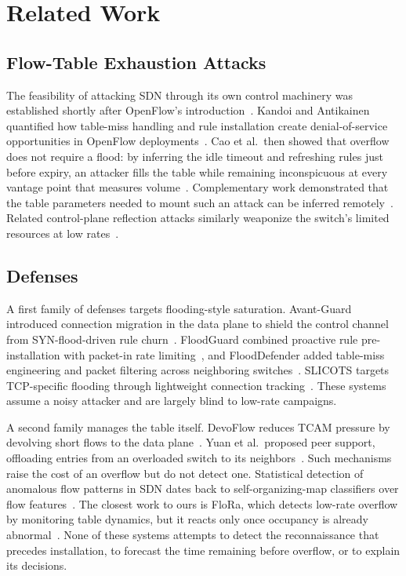 \documentclass[conference]{IEEEtran}
\begin{document}
\section{Related Work}\label{sec:related}
\subsection{Flow-Table Exhaustion Attacks}
The feasibility of attacking SDN through its own control machinery was
established shortly after OpenFlow's introduction~\cite{shin2013attacking}.
Kandoi and Antikainen quantified how table-miss handling and rule installation
create denial-of-service opportunities in OpenFlow
deployments~\cite{kandoi2015dos}. Cao et al.\ then showed that overflow does not
require a flood: by inferring the idle timeout and refreshing rules just before
expiry, an attacker fills the table while remaining inconspicuous at every
vantage point that measures volume~\cite{cao2017loft}. Complementary work
demonstrated that the table parameters needed to mount such an attack can be
inferred remotely~\cite{leng2015inference}. Related control-plane reflection
attacks similarly weaponize the switch's limited resources at low
rates~\cite{zhang2018reflection}.

\subsection{Defenses}
A first family of defenses targets flooding-style saturation.
Avant-Guard introduced connection migration in the data plane to shield the
control channel from SYN-flood-driven rule churn~\cite{shin2013avantguard}.
FloodGuard combined proactive rule pre-installation with packet-in rate
limiting~\cite{wang2015floodguard}, and FloodDefender added table-miss
engineering and packet filtering across neighboring
switches~\cite{shang2017flooddefender}. SLICOTS targets TCP-specific flooding
through lightweight connection tracking~\cite{mohammadi2017slicots}. These
systems assume a noisy attacker and are largely blind to low-rate campaigns.

A second family manages the table itself. DevoFlow reduces TCAM pressure by
devolving short flows to the data plane~\cite{curtis2011devoflow}. Yuan et al.\
proposed peer support, offloading entries from an overloaded switch to its
neighbors~\cite{yuan2019peer}. Such mechanisms raise the cost of an overflow but
do not detect one. Statistical detection of anomalous flow patterns in SDN dates
back to self-organizing-map classifiers over flow features~\cite{braga2010som}.
The closest work to ours is FloRa, which detects low-rate overflow by monitoring
table dynamics, but it reacts only once occupancy is already
abnormal~\cite{flora2024}. None of these systems attempts to detect the
reconnaissance that precedes installation, to forecast the time remaining before
overflow, or to explain its decisions.
\end{document}
